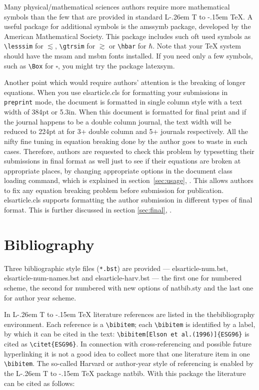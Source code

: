 \documentclass[a4paper,12pt]{article}
\makeatletter
\def\file#1{\textsf{#1}\xspace}
\DeclareRobustCommand{\LaTeX}{L\kern-.26em%
        {\sbox\z@ T%
         \vbox to\ht\z@{\hbox{\check@mathfonts
           \fontsize\sf@size\z@
           \math@fontsfalse\selectfont
          A\,}%
         \vss}%
        }%
     \kern-.15em%
    \TeX}
\makeatother
\begin{document}
Many physical/mathematical sciences authors require more
mathematical symbols than the few that are provided in standard
\LaTeX. A useful package for additional symbols is the
\file{amssymb} package, developed by the American Mathematical
Society. This package includes such oft used symbols as
\verb+\lesssim+ for $\lesssim$, \verb+\gtrsim+ for $\gtrsim$ or
\verb+\hbar+ for $\hbar$. Note that your \TeX{} system should
have the \file{msam} and \file{msbm} fonts installed. If you need
only a few symbols, such as \verb+\Box+ for $\square$, you might
try the package \file{latexsym}.

Another point which would require authors' attention is the
breaking of longer equations.  When you use
\file{elsarticle.cls} for formatting your submissions in
\verb+preprint+ mode, the document is formatted in single column
style with a text width of 384pt or 5.3in.  When this document is
formatted for final print and if the journal happens to be a double column
journal, the text width will be reduced to 224pt at for 3+
double column and 5+ journals respectively. All the nifty fine
tuning in equation breaking done by the author goes to waste in
such cases.  Therefore, authors are requested to check this
problem by typesetting their submissions in final format as well
just to see if their equations are broken at appropriate places,
by changing appropriate options in the document class loading
command, which is explained in section~\ref{sec:usage},
. This allows authors to fix any equation breaking
problem before submission for publication.
\file{elsarticle.cls} supports formatting the author submission
in different types of final format.  This is further discussed in
section \ref{sec:final}, .

\section{Bibliography}
\hypertarget{bibliography}{}

Three bibliographic style files (\verb+*.bst+) are provided ---
\file{elsarticle-num.bst}, \file{elsarticle-num-names.bst} and
\file{elsarticle-harv.bst} --- the first one for numbered scheme, the
second for numbered with new options of \file{natbib.sty} and the
last one for author year scheme.

In \LaTeX{} literature references are listed in the
thebibliography environment.  Each reference is a
\verb+\bibitem+; each \verb+\bibitem+ is identified by a label,
by which it can be cited in the text:
\verb+\bibitem[Elson et al.(1996)]{ESG96}+ is cited as
\verb+\citet{ESG96}+. In connection with cross-referencing and
possible future hyperlinking it is not a good idea to collect
more that one literature item in one \verb+\bibitem+.  The
so-called Harvard or author-year style of referencing is enabled
by the \LaTeX{} package \file{natbib}. With this package the
literature can be cited as follows:
\end{document}
